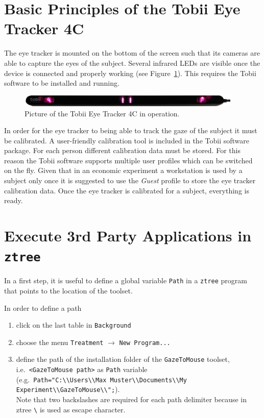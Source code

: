 \documentclass[a4paper,oneside]{book}
\begin{document}
\section{Basic Principles of the Tobii Eye Tracker 4C}
\label{sec.eyetracker}
The eye tracker is mounted on the bottom of the screen such that its cameras are able to capture the eyes of the subject.
Several infrared LEDs are visible once the device is connected and properly working (see Figure~\ref{fig.eyetracker}).
This requires the Tobii software to be installed and running.
\begin{figure}[ht]
    \centering
    \includegraphics[width=0.95\textwidth]{eye_tracker.jpg}
    \caption{Picture of the Tobii Eye Tracker 4C in operation.}
    \label{fig.eyetracker}
\end{figure}

In order for the eye tracker to being able to track the gaze of the subject it must be calibrated.
A user-friendly calibration tool is included in the Tobii software package.
For each person different calibration data must be stored.
For this reason the Tobii software supports multiple user profiles which can be switched on the fly.
Given that in an economic experiment a workstation is used by a subject only once it is suggested to use the \emph{Guest} profile to store the eye tracker calibration data.
Once the eye tracker is calibrated for a subject, everything is ready.

\section{Execute 3rd Party Applications in \texttt{ztree}}
\label{sec.external}
In a first step, it is useful to define a global variable \texttt{Path} in a \texttt{ztree} program that points to the location of the toolset.

In order to define a path
\begin{enumerate}
    \item click on the last table in \texttt{Background}
    \item choose the menu \texttt{Treatment} $\rightarrow$ \texttt{New Program...}
    \item define the path of the installation folder of the \texttt{GazeToMouse} toolset, i.e.~\texttt{<GazeToMouse path>} as \texttt{Path} variable\\
        (e.g.~\texttt{Path="C:\textbackslash\textbackslash Users\textbackslash\textbackslash Max Muster\textbackslash\textbackslash Documents\textbackslash\textbackslash My Experiment\textbackslash\textbackslash GazeToMouse\textbackslash\textbackslash";}). \\
        Note that two backslashes are required for each path delimiter because in ztree \texttt{\textbackslash} is used as escape character.
\end{enumerate}
\end{document}
